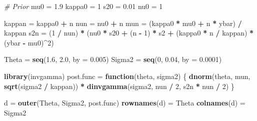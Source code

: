\documentclass[]{article}
\newenvironment{Shaded}{\begin{snugshade}}{\end{snugshade}}
\newcommand{\CommentTok}[1]{\textcolor[rgb]{0.56,0.35,0.01}{\textit{#1}}}
\newcommand{\ControlFlowTok}[1]{\textcolor[rgb]{0.13,0.29,0.53}{\textbf{#1}}}
\newcommand{\DataTypeTok}[1]{\textcolor[rgb]{0.13,0.29,0.53}{#1}}
\newcommand{\DecValTok}[1]{\textcolor[rgb]{0.00,0.00,0.81}{#1}}
\newcommand{\FloatTok}[1]{\textcolor[rgb]{0.00,0.00,0.81}{#1}}
\newcommand{\KeywordTok}[1]{\textcolor[rgb]{0.13,0.29,0.53}{\textbf{#1}}}
\newcommand{\NormalTok}[1]{#1}
\newcommand{\OperatorTok}[1]{\textcolor[rgb]{0.81,0.36,0.00}{\textbf{#1}}}
\newcommand{\StringTok}[1]{\textcolor[rgb]{0.31,0.60,0.02}{#1}}
\begin{document}
\begin{Shaded}
\begin{Highlighting}[]
\CommentTok{# Prior}
\NormalTok{mu0 =}\StringTok{ }\FloatTok{1.9}
\NormalTok{kappa0 =}\StringTok{ }\DecValTok{1}
\NormalTok{s20 =}\StringTok{ }\FloatTok{0.01}
\NormalTok{nu0 =}\StringTok{ }\DecValTok{1}

\NormalTok{kappan =}\StringTok{ }\NormalTok{kappa0 }\OperatorTok{+}\StringTok{ }\NormalTok{n}
\NormalTok{nun =}\StringTok{ }\NormalTok{nu0 }\OperatorTok{+}\StringTok{ }\NormalTok{n}
\NormalTok{mun =}\StringTok{ }\NormalTok{(kappa0 }\OperatorTok{*}\StringTok{ }\NormalTok{mu0 }\OperatorTok{+}\StringTok{ }\NormalTok{n }\OperatorTok{*}\StringTok{ }\NormalTok{ybar) }\OperatorTok{/}\StringTok{ }\NormalTok{kappan}
\NormalTok{s2n =}\StringTok{ }\NormalTok{(}\DecValTok{1} \OperatorTok{/}\StringTok{ }\NormalTok{nun) }\OperatorTok{*}\StringTok{ }\NormalTok{(nu0 }\OperatorTok{*}\StringTok{ }\NormalTok{s20 }\OperatorTok{+}\StringTok{ }\NormalTok{(n }\OperatorTok{-}\StringTok{ }\DecValTok{1}\NormalTok{) }\OperatorTok{*}\StringTok{ }\NormalTok{s2 }\OperatorTok{+}\StringTok{ }\NormalTok{(kappa0 }\OperatorTok{*}\StringTok{ }\NormalTok{n }\OperatorTok{/}\StringTok{ }\NormalTok{kappan) }\OperatorTok{*}\StringTok{ }\NormalTok{(ybar }\OperatorTok{-}\StringTok{ }\NormalTok{mu0)}\OperatorTok{^}\DecValTok{2}\NormalTok{)}

\NormalTok{Theta =}\StringTok{ }\KeywordTok{seq}\NormalTok{(}\FloatTok{1.6}\NormalTok{, }\FloatTok{2.0}\NormalTok{, }\DataTypeTok{by =} \FloatTok{0.005}\NormalTok{)}
\NormalTok{Sigma2 =}\StringTok{ }\KeywordTok{seq}\NormalTok{(}\DecValTok{0}\NormalTok{, }\FloatTok{0.04}\NormalTok{, }\DataTypeTok{by =} \FloatTok{0.0001}\NormalTok{)}

\KeywordTok{library}\NormalTok{(invgamma)}
\NormalTok{post.func =}\StringTok{ }\ControlFlowTok{function}\NormalTok{(theta, sigma2) \{}
  \KeywordTok{dnorm}\NormalTok{(theta, mun, }\KeywordTok{sqrt}\NormalTok{(sigma2 }\OperatorTok{/}\StringTok{ }\NormalTok{kappan)) }\OperatorTok{*}\StringTok{ }\KeywordTok{dinvgamma}\NormalTok{(sigma2, nun }\OperatorTok{/}\StringTok{ }\DecValTok{2}\NormalTok{, s2n }\OperatorTok{*}\StringTok{ }\NormalTok{nun }\OperatorTok{/}\StringTok{ }\DecValTok{2}\NormalTok{)}
\NormalTok{\}}

\NormalTok{d =}\StringTok{ }\KeywordTok{outer}\NormalTok{(Theta, Sigma2, post.func)}
\KeywordTok{rownames}\NormalTok{(d) =}\StringTok{ }\NormalTok{Theta}
\KeywordTok{colnames}\NormalTok{(d) =}\StringTok{ }\NormalTok{Sigma2}


\end{Highlighting}
\end{Shaded}
\end{document}
